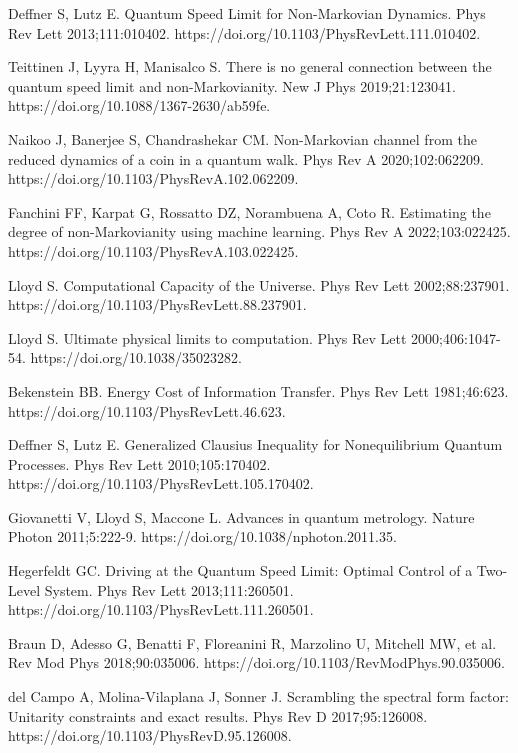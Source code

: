\documentclass[
showpacs,  %
showkeys,  %
aps,       %
amsthm,    %
amsmath,   %
amsfonts,  %
amssymb    %
]{revtex4-1}          %
\begin{document}
\begin{thebibliography}{}
Deffner S, Lutz E. Quantum Speed Limit for Non-Markovian Dynamics. Phys Rev Lett 2013;111:010402. https://doi.org/10.1103/PhysRevLett.111.010402.

Teittinen J, Lyyra H, Manisalco S. There is no general connection between the quantum speed limit and non-Markovianity. New J Phys 2019;21:123041. https://doi.org/10.1088/1367-2630/ab59fe.

Naikoo J, Banerjee S, Chandrashekar CM. Non-Markovian channel from the reduced dynamics of a coin in a quantum walk. Phys Rev A 2020;102:062209. https://doi.org/10.1103/PhysRevA.102.062209.

Fanchini FF, Karpat G, Rossatto DZ, Norambuena A, Coto R. Estimating the degree of non-Markovianity using machine learning. Phys Rev A 2022;103:022425. https://doi.org/10.1103/PhysRevA.103.022425.

Lloyd S. Computational Capacity of the Universe. Phys Rev Lett 2002;88:237901. https://doi.org/10.1103/PhysRevLett.88.237901.

Lloyd S. Ultimate physical limits to computation. Phys Rev Lett 2000;406:1047-54. https://doi.org/10.1038/35023282.

Bekenstein BB. Energy Cost of Information Transfer. Phys Rev Lett 1981;46:623. https://doi.org/10.1103/PhysRevLett.46.623.

Deffner S, Lutz E. Generalized Clausius Inequality for Nonequilibrium Quantum Processes. Phys Rev Lett 2010;105:170402. https://doi.org/10.1103/PhysRevLett.105.170402.

Giovanetti V, Lloyd S, Maccone L. Advances in quantum metrology. Nature Photon 2011;5:222-9. https://doi.org/10.1038/nphoton.2011.35.

Hegerfeldt GC. Driving at the Quantum Speed Limit: Optimal Control of a Two-Level System. Phys Rev Lett 2013;111:260501. https://doi.org/10.1103/PhysRevLett.111.260501.

Braun D, Adesso G, Benatti F, Floreanini R, Marzolino U, Mitchell MW, et al. Rev Mod Phys 2018;90:035006. https://doi.org/10.1103/RevModPhys.90.035006.

del Campo A, Molina-Vilaplana J, Sonner J. Scrambling the spectral form factor: Unitarity constraints and exact results. Phys Rev D 2017;95:126008. https://doi.org/10.1103/PhysRevD.95.126008.


\end{thebibliography}
\end{document}
